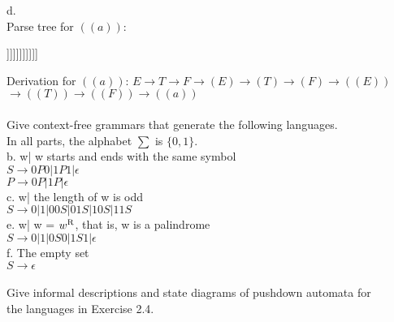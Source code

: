 \documentclass[12pt]{article}
\begin{document}
\noindent
d. \\

\noindent
Parse tree for $((a))$: \\
\begin{center}
	\begin{forest}
		[E [T [F [(E) [(T) [(F) [((E)) [((T)) [((F)) [a]]]]]]]]]]]
	\end{forest}
\end{center}

\noindent
Derivation for $((a))$:  $E \rightarrow T \rightarrow F \rightarrow (E) \rightarrow (T) \rightarrow (F) \rightarrow ((E)) $  \\
$ \rightarrow ((T)) \rightarrow ((F)) \rightarrow ((a)) $ \\


 \\
Give context-free grammars that generate the following languages. \\
In all parts, the alphabet $\sum$ is $\{0,1\}$. \\

\noindent
b. {w| w starts and ends with the same symbol} \\
$ S \rightarrow 0P0|1P1| \epsilon $ \\
$ P \rightarrow 0P|1P| \epsilon $ \\

\noindent
c. {w| the length of w is odd} \\
$ S \rightarrow 0|1|00S|01S|10S|11S $ \\

\noindent
e. {w| w = $w\textsuperscript{R}$, that is, w is a palindrome} \\
$ S \rightarrow 0|1|0S0|1S1| \epsilon $ \\

\noindent
f. The empty set \\
$ S \rightarrow \epsilon $ \\


 \\
Give informal descriptions and state diagrams of pushdown automata for \\
the languages in Exercise 2.4. \\
\end{document}
